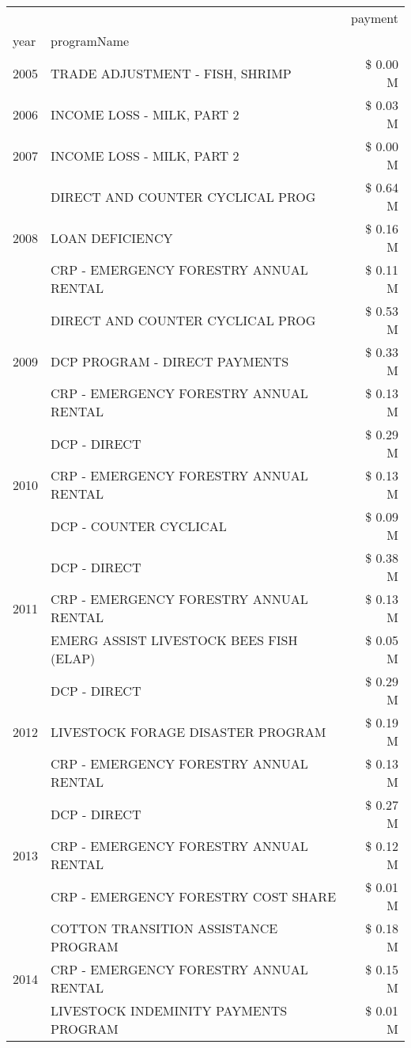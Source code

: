 \begin{tabular}{llr}
\toprule
 &  & payment \\
year & programName &  \\
\midrule
2005 & TRADE ADJUSTMENT - FISH, SHRIMP & \$ 0.00 M \\
\cline{1-3}
2006 & INCOME LOSS - MILK, PART 2 & \$ 0.03 M \\
\cline{1-3}
2007 & INCOME LOSS - MILK, PART 2 & \$ 0.00 M \\
\cline{1-3}
\multirow[t]{3}{*}{2008} & DIRECT AND COUNTER CYCLICAL PROG & \$ 0.64 M \\
 & LOAN DEFICIENCY & \$ 0.16 M \\
 & CRP - EMERGENCY FORESTRY ANNUAL RENTAL & \$ 0.11 M \\
\cline{1-3}
\multirow[t]{3}{*}{2009} & DIRECT AND COUNTER CYCLICAL PROG & \$ 0.53 M \\
 & DCP PROGRAM - DIRECT PAYMENTS & \$ 0.33 M \\
 & CRP - EMERGENCY FORESTRY ANNUAL RENTAL & \$ 0.13 M \\
\cline{1-3}
\multirow[t]{3}{*}{2010} & DCP - DIRECT & \$ 0.29 M \\
 & CRP - EMERGENCY FORESTRY ANNUAL RENTAL & \$ 0.13 M \\
 & DCP - COUNTER CYCLICAL & \$ 0.09 M \\
\cline{1-3}
\multirow[t]{3}{*}{2011} & DCP - DIRECT & \$ 0.38 M \\
 & CRP - EMERGENCY FORESTRY ANNUAL RENTAL & \$ 0.13 M \\
 & EMERG ASSIST LIVESTOCK BEES FISH (ELAP) & \$ 0.05 M \\
\cline{1-3}
\multirow[t]{3}{*}{2012} & DCP - DIRECT & \$ 0.29 M \\
 & LIVESTOCK FORAGE DISASTER PROGRAM & \$ 0.19 M \\
 & CRP - EMERGENCY FORESTRY ANNUAL RENTAL & \$ 0.13 M \\
\cline{1-3}
\multirow[t]{3}{*}{2013} & DCP - DIRECT & \$ 0.27 M \\
 & CRP - EMERGENCY FORESTRY ANNUAL RENTAL & \$ 0.12 M \\
 & CRP - EMERGENCY FORESTRY COST SHARE & \$ 0.01 M \\
\cline{1-3}
\multirow[t]{3}{*}{2014} & COTTON TRANSITION ASSISTANCE PROGRAM & \$ 0.18 M \\
 & CRP - EMERGENCY FORESTRY ANNUAL RENTAL & \$ 0.15 M \\
 & LIVESTOCK INDEMINITY PAYMENTS PROGRAM & \$ 0.01 M \\

\end{tabular}

